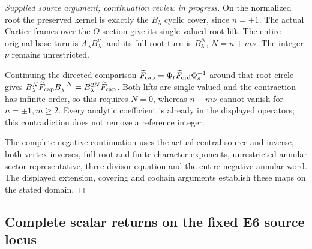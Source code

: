 \begin{proof}[Supplied source argument; continuation review in progress]
On the normalized root the preserved kernel is exactly the
\(B_\lambda\) cyclic cover, since \(n=\pm1\). The actual Cartier
frames over the \(O\)-section give its single-valued root lift.
The entire original-base turn is \(A_\lambda B_\lambda^\nu\),
and its full root turn is \(B_\lambda^N\),
\(N=n+m\nu\). The integer \(\nu\) remains unrestricted.

Continuing the directed comparison
\(\widetilde F_{\rm cap}=\Phi_t\widetilde F_{\rm ord}\Phi_s^{-1}\)
around that root circle gives
\(B_\lambda^N\widetilde F_{\rm cap}B_\lambda^{-N}
=B_\lambda^{2N}\widetilde F_{\rm cap}\).
Both lifts are single valued and the contraction has infinite
order, so this requires \(N=0\), whereas
\(n+m\nu\) cannot vanish for \(n=\pm1,m\geq2\).
Every analytic coefficient is already in the displayed operators;
this contradiction does not remove a reference integer.

The complete negative continuation uses the actual central
source and inverse, both vertex inverses, full root and finite-character
exponents, unrestricted annular sector representative, three-divisor
equation and the entire negative annular word. The displayed extension,
covering and cochain arguments establish these maps on the stated domain.


\end{proof}


\subsection{Complete scalar returns on the fixed E6 source locus}
